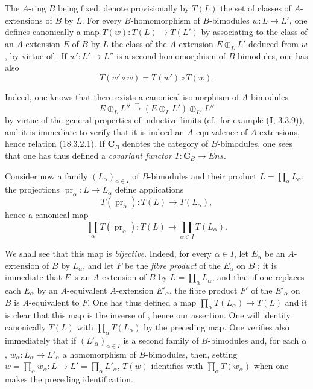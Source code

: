 \begin{env}[18.3.2]
\label{0.18.3.2}
The $A$-ring $B$ being fixed, denote provisionally by $T(L)$ the set of classes of $A$-extensions of $B$ by $L$.
For every $B$-homomorphism of $B$-bimodules $w:L\to L'$, one defines canonically a map $T(w):T(L)\to T(L')$ by associating to the class of an $A$-extension $E$ of $B$ by $L$ the class of the $A$-extension $E\oplus_L L'$ deduced from $w$, by virtue of .
If $w':L'\to L''$ is a second homomorphism of $B$-bimodules, one has also
\begin{equation}
\tag{18.3.2.1}
  \label{0.18.3.2.1}
  T(w'\circ w)=T(w')\circ T(w).
\end{equation}

Indeed, one knows that there exists a canonical isomorphism of $A$-bimodules
\[
  E\oplus_L L''\xrightarrow{\sim}(E\oplus_L L')\oplus_{L'} L''
\]
by virtue of the general properties of inductive limits (cf.\ for example ($\mathbf{I}$, 3.3.9)), and it is immediate to verify that it is indeed an $A$-equivalence of $A$-extensions, hence
relation (18.3.2.1). If $\boldsymbol{C}_B$ denotes the category of $B$-bimodules, one sees that one has thus defined a \emph{covariant functor} $T:\boldsymbol{C}_B\to\boldsymbol{\mathit{Ens}}$.
\end{env}

\begin{env}[18.3.3]
\label{0.18.3.3}
Consider now a family $(L_\alpha)_{\alpha\in I}$ of $B$-bimodules and their product $L=\prod_\alpha L_\alpha$; the projections $\operatorname{pr}_\alpha:L\to L_\alpha$ define applications
\[
  T(\operatorname{pr}_\alpha):T(L)\to T(L_\alpha),
\]
hence a canonical map
\begin{equation}
\tag{18.3.3.1}
  \label{0.18.3.3.1}
  \prod_\alpha T(\operatorname{pr}_\alpha):T(L)\to\prod_{\alpha\in I} T(L_\alpha).
\end{equation}

We shall see that this map is \emph{bijective}.
Indeed, for every $\alpha\in I$, let $E_\alpha$ be an $A$-extension of $B$ by $L_\alpha$, and let $F$ be the \emph{fibre product} of the $E_\alpha$ on $B$ ; it is immediate that $F$ is an $A$-extension of $B$ by $L=\prod_\alpha L_\alpha$, and that if one replaces each $E_\alpha$ by an $A$-equivalent $A$-extension $E'_\alpha$, the fibre product $F'$ of the $E'_\alpha$ on $B$ is $A$-equivalent to $F$.
One has thus defined a map $\prod_\alpha T(L_\alpha)\to T(L)$ and it is clear that this map is the inverse of , hence our assertion.
One will identify canonically $T(L)$ with $\prod_\alpha T(L_\alpha)$ by the preceding map.
One verifies also immediately that if $(L'_\alpha)_{\alpha\in I}$ is a second family of $B$-bimodules and, for each $\alpha$, $w_\alpha:L_\alpha\to L'_\alpha$ a homomorphism of $B$-bimodules, then, setting $w=\prod_\alpha w_\alpha:L\to L'=\prod_\alpha L'_\alpha$, $T(w)$ identifies with $\prod_\alpha T(w_\alpha)$ when one makes the preceding identification.
\end{env}

